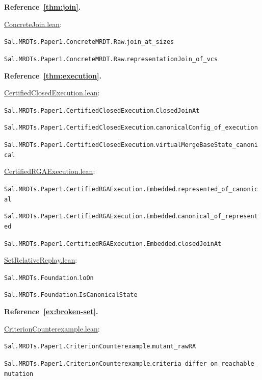 \medskip\noindent\textbf{Reference~\ref{thm:join}.}\par\nobreak
\noindent\href{https://github.com/fplaunchpad/sal/blob/paper1/Sal/MRDTs/Paper1/ConcreteJoin.lean}{ConcreteJoin.lean}:\par
{\small\nolinkurl{Sal.MRDTs.Paper1.ConcreteMRDT.Raw}.\allowbreak\nolinkurl{join_at_sizes}}\par
{\small\nolinkurl{Sal.MRDTs.Paper1.ConcreteMRDT.Raw}.\allowbreak\nolinkurl{representationJoin_of_vcs}}\par

\medskip\noindent\textbf{Reference~\ref{thm:execution}.}\par\nobreak
\noindent\href{https://github.com/fplaunchpad/sal/blob/paper1/Sal/MRDTs/Paper1/CertifiedClosedExecution.lean}{CertifiedClosedExecution.lean}:\par
{\small\nolinkurl{Sal.MRDTs.Paper1.CertifiedClosedExecution}.\allowbreak\nolinkurl{ClosedJoinAt}}\par
{\small\nolinkurl{Sal.MRDTs.Paper1.CertifiedClosedExecution}.\allowbreak\nolinkurl{canonicalConfig_of_execution}}\par
{\small\nolinkurl{Sal.MRDTs.Paper1.CertifiedClosedExecution}.\allowbreak\nolinkurl{virtualMergeBaseState_canonical}}\par
\noindent\href{https://github.com/fplaunchpad/sal/blob/paper1/Sal/MRDTs/Paper1/CertifiedRGAExecution.lean}{CertifiedRGAExecution.lean}:\par
{\small\nolinkurl{Sal.MRDTs.Paper1.CertifiedRGAExecution.Embedded}.\allowbreak\nolinkurl{represented_of_canonical}}\par
{\small\nolinkurl{Sal.MRDTs.Paper1.CertifiedRGAExecution.Embedded}.\allowbreak\nolinkurl{canonical_of_represented}}\par
{\small\nolinkurl{Sal.MRDTs.Paper1.CertifiedRGAExecution.Embedded}.\allowbreak\nolinkurl{closedJoinAt}}\par
\noindent\href{https://github.com/fplaunchpad/sal/blob/paper1/Sal/MRDTs/Metatheory/Join/SetRelativeReplay.lean}{SetRelativeReplay.lean}:\par
{\small\nolinkurl{Sal.MRDTs.Foundation}.\allowbreak\nolinkurl{loOn}}\par
{\small\nolinkurl{Sal.MRDTs.Foundation}.\allowbreak\nolinkurl{IsCanonicalState}}\par

\medskip\noindent\textbf{Reference~\ref{ex:broken-set}.}\par\nobreak
\noindent\href{https://github.com/fplaunchpad/sal/blob/paper1/Sal/MRDTs/Paper1/CriterionCounterexample.lean}{CriterionCounterexample.lean}:\par
{\small\nolinkurl{Sal.MRDTs.Paper1.CriterionCounterexample}.\allowbreak\nolinkurl{mutant_rawRA}}\par
{\small\nolinkurl{Sal.MRDTs.Paper1.CriterionCounterexample}.\allowbreak\nolinkurl{criteria_differ_on_reachable_mutation}}\par

